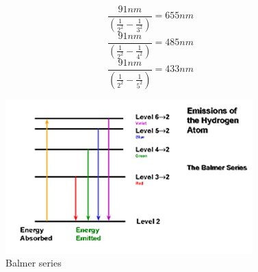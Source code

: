 \documentclass{article}
\begin{document}
  $$\frac{91nm}{(\frac{1}{2^2}-\frac{1}{3^2})}=655nm $$
  $$\frac{91nm}{(\frac{1}{2^2}-\frac{1}{4^2})}=485nm $$
  $$\frac{91nm}{(\frac{1}{2^2}-\frac{1}{5^2})}=433nm $$
  
\begin{figure}[h!]
\centering
\includegraphics[scale=1]{balmer2.png}
\caption{Balmer series}
\label{fig:univerise}
\end{figure}
\end{document}
